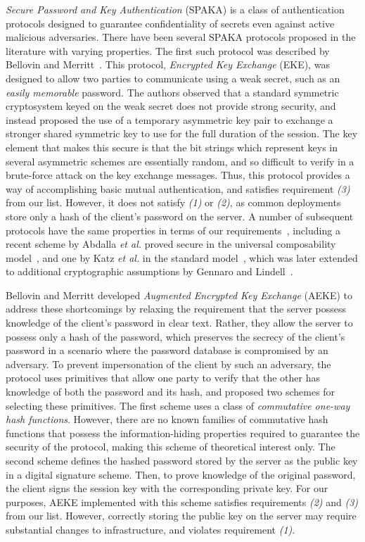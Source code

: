 \textit{Secure Password and Key Authentication} (SPAKA) is a class of
authentication protocols designed to guarantee confidentiality of
secrets even against active malicious adversaries. There have been
several SPAKA protocols proposed in the literature with varying
properties. The first such protocol was described by Bellovin and
Merritt~\cite{bellovin92}. This protocol, \emph{Encrypted Key
Exchange} (EKE), was designed to allow two parties to communicate using
a weak secret, such as an \emph{easily memorable} password. The
authors observed that a standard symmetric cryptosystem keyed on the
weak secret does not provide strong security, and instead proposed the
use of a temporary asymmetric key pair to exchange a stronger shared
symmetric key to use for the full duration of the session. The key
element that makes this secure is that the bit strings which represent
keys in several asymmetric schemes are essentially random, and so
difficult to verify in a brute-force attack on the key exchange
messages. Thus, this protocol provides a way of accomplishing basic
mutual authentication, and satisfies requirement \textit{(3)} from our
list. However, it does not satisfy \textit{(1)} or \textit{(2)}, as
common deployments store only a hash of the client's password on the
server. A number of subsequent protocols have the same properties in
terms of our
requirements~\cite{abdalla06,abdalla05,bellare00,boyko00,gentry05,mack00,zhang04},
including a recent scheme by Abdalla \textit{et al.} proved secure in
the universal composability model~\cite{abdalla08}, and one by Katz
\textit{et al.} in the standard model~\cite{katz01,katz02}, which was
later extended to additional cryptographic assumptions by Gennaro and
Lindell~\cite{gennaro08,gennaro03}.

Bellovin and Merritt developed \emph{Augmented Encrypted Key Exchange}
(AEKE) \cite{bellovin93} to address these shortcomings by relaxing the
requirement that the server possess knowledge of the client's password
in clear text. Rather, they allow the server to possess only a hash of
the password, which preserves the secrecy of the client's password in
a scenario where the password database is compromised by an
adversary. To prevent impersonation of the client by such an
adversary, the protocol uses primitives that allow one party to verify
that the other has knowledge of both the password and its hash, and
proposed two schemes for selecting these primitives. The first scheme
uses a class of \emph{commutative one-way hash functions}. However,
there are no known families of commutative hash functions that possess
the information-hiding properties required to guarantee the security
of the protocol, making this scheme of theoretical interest only. The
second scheme defines the hashed password stored by the server as the
public key in a digital signature scheme. Then, to prove knowledge of
the original password, the client signs the session key with the
corresponding private key. For our purposes, AEKE implemented with
this scheme satisfies requirements \textit{(2)} and \textit{(3)} from
our list. However, correctly storing the public key on the server may
require substantial changes to infrastructure, and violates
requirement \textit{(1)}.

